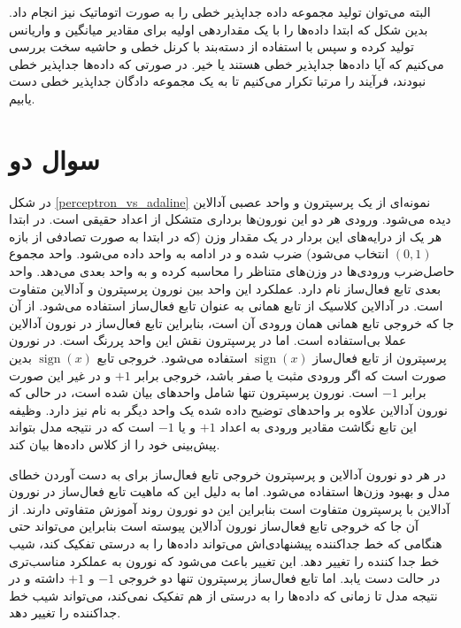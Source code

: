 \documentclass[12pt, a4paper]{article}
\DeclareMathOperator{\sign}{sign}
\begin{document}
البته می‌توان تولید مجموعه داده جداپذیر خطی را به صورت اتوماتیک نیز انجام داد.
بدین شکل که ابتدا داده‌ها را با یک مقدار‌دهی اولیه برای مقادیر میانگین و واریانس تولید کرده و سپس با استفاده
از دسته‌بند  با کرنل خطی و حاشیه سخت بررسی می‌کنیم که آیا داده‌ها جداپذیر خطی هستند یا خیر. در صورتی که
داده‌ها جداپذیر خطی نبودند، فرآیند را مرتبا تکرار می‌کنیم تا به یک مجموعه دادگان جداپذیر خطی دست یابیم.

\clearpage

\section*{سوال دو}

در شکل \ref{perceptron_vs_adaline} نمونه‌ای از یک پرسپترون و واحد عصبی آدالاین دیده می‌شود.
ورودی هر دو این نورون‌ها برداری متشکل از اعداد حقیقی است. در ابتدا هر یک از درایه‌های این بردار
در یک مقدار وزن (که در ابتدا به صورت تصادفی از بازه $(0,1)$ انتخاب می‌شود)
ضرب شده و در ادامه به واحد  داده می‌شود. واحد  مجموع
حاصل‌ضرب ورودی‌ها در وزن‌های متناظر را محاسبه کرده و به واحد بعدی می‌دهد. واحد بعدی تابع فعال‌ساز نام دارد.
عملکرد این واحد بین نورون پرسپترون و آدالاین متفاوت است. در آدالاین کلاسیک از تابع همانی به عنوان تابع
فعال‌ساز استفاده می‌شود. از آن جا که خروجی تابع همانی همان ورودی آن است، بنابراین تابع فعال‌ساز در نورون آدالاین
عملا بی‌استفاده است. اما در پرسپترون نقش این واحد پررنگ است. در نورون پرسپترون از تابع فعال‌ساز $\sign(x)$
استفاده می‌شود. خروجی تابع $\sign(x)$ بدین صورت است که اگر ورودی مثبت یا صفر باشد، خروجی برابر $+1$ و در غیر این صورت
برابر $-1$ است. نورون پرسپترون تنها شامل واحد‌های بیان شده است، در حالی که نورون آدالاین علاوه بر واحد‌های
توضیح داده شده یک واحد دیگر به نام  نیز دارد. وظیفه این تابع نگاشت مقادیر ورودی به اعداد
$+1$ و یا $-1$ است که در نتیجه مدل بتواند پیش‌بینی خود را از کلاس داده‌ها بیان کند.

در هر دو نورون آدالاین و پرسپترون خروجی تابع فعال‌ساز برای به دست آوردن خطای مدل و بهبود وزن‌ها استفاده می‌شود.
اما به دلیل این که ماهیت تابع فعال‌ساز در نورون آدالاین با پرسپترون متفاوت است بنابراین این دو نورون
روند آموزش متفاوتی دارند. از آن جا که خروجی تابع فعال‌ساز نورون آدالاین پیوسته است بنابراین می‌تواند
حتی هنگامی که خط جداکننده پیشنهادی‌اش می‌تواند داده‌ها را به درستی تفکیک کند، شیب خط جدا کننده را تغییر
دهد. این تغییر باعث می‌شود که نورون به عملکرد مناسب‌تری در حالت  دست یابد. اما تابع فعال‌ساز
پرسپترون تنها دو خروجی $-1$ و $+1$ داشته و در نتیجه مدل تا زمانی که داده‌ها را به درستی از هم تفکیک
نمی‌کند، می‌تواند شیب خط جداکننده را تغییر دهد.
\end{document}
